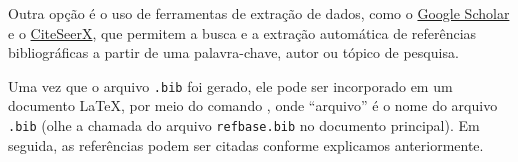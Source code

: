 Outra opção é o uso de ferramentas de extração de dados, como o \href{https://scholar.google.com.br}{Google Scholar} e o \href{https://citeseerx.ist.psu.edu}{CiteSeerX}, que permitem a busca e a extração automática de referências bibliográficas a partir de uma palavra-chave, autor ou tópico de pesquisa.

Uma vez que o arquivo \verb|.bib| foi gerado, ele pode ser incorporado em um documento \LaTeX,  por meio do comando \verb||, onde ``arquivo'' é o nome do arquivo \verb|.bib| (olhe a chamada do arquivo \verb|refbase.bib| no documento principal). Em seguida, as referências podem ser citadas conforme explicamos anteriormente.